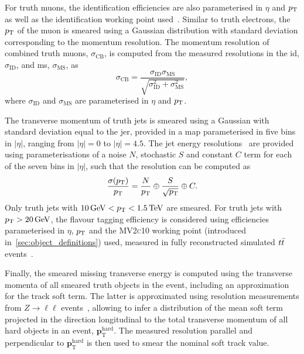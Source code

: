 For truth muons, the identification efficiencies are also parameterised in $\eta$ and $p_{\textrm{T}}$ as well as the identification working point used~\cite{Aad:2020gmm}. Similar to truth electrons, the  $p_{\textrm{T}}$ of the muon is smeared using a Gaussian distribution with standard deviation corresponding to the momentum resolution. The momentum resolution of combined truth muons, $\sigma_\mathrm{CB}$, is computed from the measured resolutions in the \gls{id}, $\sigma_\mathrm{ID}$, and \gls{ms}, $\sigma_\mathrm{MS}$, as
\begin{equation}
	\sigma_\mathrm{CB} = \frac{\sigma_\mathrm{ID}\sigma_\mathrm{MS}}{\sqrt{\sigma_\mathrm{ID}^2 + \sigma_\mathrm{MS}^2}},
\end{equation}
where $\sigma_\mathrm{ID}$ and $\sigma_\mathrm{MS}$ are parameterised in $\eta$ and $p_{\textrm{T}}$.

The transverse momentum of truth jets is smeared using a Gaussian with standard deviation equal to the \gls{jer}, provided in a map parameterised in five bins in $\vert\eta\vert$, ranging from $\vert\eta\vert = 0$ to $\vert\eta\vert = 4.5$. The jet energy resolutions~\cite{Aad:2020flx} are provided using parameterisations of a noise $N$, stochastic $S$ and constant $C$ term for each of the seven bins in $\vert\eta\vert$, such that the resolution can be computed as
\begin{equation}
	\frac{\sigma(p_{\textrm{T}})}{p_{\textrm{T}}} = \frac{N}{p_{\textrm{T}}}\oplus\frac{S}{\sqrt{p_{\textrm{T}}}}\oplus C.
\end{equation}
Only truth jets with $\SI{10}{\GeV} < \pt < \SI{1.5}{\TeV}$ are smeared. For truth jets with $\pt > \SI{20}{\GeV}$, the flavour tagging efficiency is considered using efficiencies parameterised in $\eta$, $p_{\textrm{T}}$ and the \textsc{MV2c10} working point (introduced in~\cref{sec:object_definitions}) used, measured in fully reconstructed simulated $t\bar{t}$ events~\cite{FTAG-2018-01}.

Finally, the smeared missing transverse energy is computed using the transverse momenta of all smeared truth objects in the event, including an approximation for the track soft term. The latter is approximated using resolution measurements from $Z\rightarrow \ell\ell$ events~\cite{ATLAS-CONF-2018-023}, allowing to infer a distribution of the mean soft term projected in the direction longitudinal to the total transverse momentum of all hard objects in an event, $\boldsymbol{p}_\mathrm{T}^\mathrm{hard}$. The measured resolution parallel and perpendicular to $\boldsymbol{p}_\mathrm{T}^\mathrm{hard}$ is then used to smear the nominal soft track value.
 
